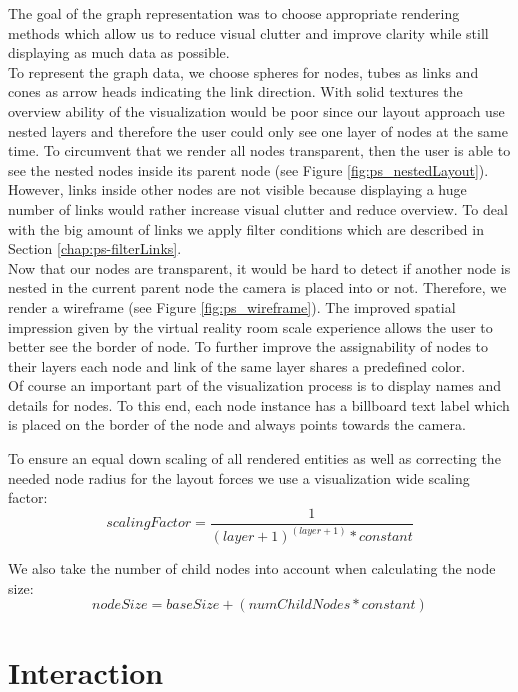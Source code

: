 The goal of the graph representation was to choose appropriate rendering methods which allow us to reduce visual clutter and improve clarity while still displaying as much data as possible.\\
To represent the graph data, we choose spheres for nodes, tubes as links and cones as arrow heads indicating the link direction.
With solid textures the overview ability of the visualization would be poor since our layout approach use nested layers and therefore the user could only see one layer of nodes at the same time. To circumvent that we render all nodes transparent, then the user is able to see the nested nodes inside its parent node (see Figure \ref{fig:ps_nestedLayout}). 
However, links inside other nodes are not visible because displaying a huge number of links would rather increase visual clutter and reduce overview. To deal with the big amount of links we apply filter conditions which are described in Section \ref{chap:ps-filterLinks}.
\\ Now that our nodes are transparent, it would be hard to detect if another node is nested in the current parent node the camera is placed into or not. Therefore, we render a wireframe (see Figure \ref{fig:ps_wireframe}). The improved spatial impression given by the virtual reality room scale experience allows the user to better see the border of node. To further improve the assignability of nodes to their layers each node and link of the same layer shares a predefined color.\\
Of course an important part of the visualization process is to display names and details for nodes. To this end, each node instance has a billboard text label which is placed on the border of the node and always points towards the camera.

To ensure an equal down scaling of all rendered entities as well as correcting the needed node radius for the layout forces we use a visualization wide scaling factor:
\begin{equation}
    scalingFactor = \frac{1}{(layer+1)^{(layer+1)} * constant}
\end{equation}

\pagebreak

We also take the number of child nodes into account when calculating the node size: 
\begin{equation}
    nodeSize = baseSize + (numChildNodes * constant)
\end{equation}

\section{Interaction}
\label{chap:solution-interaction}

